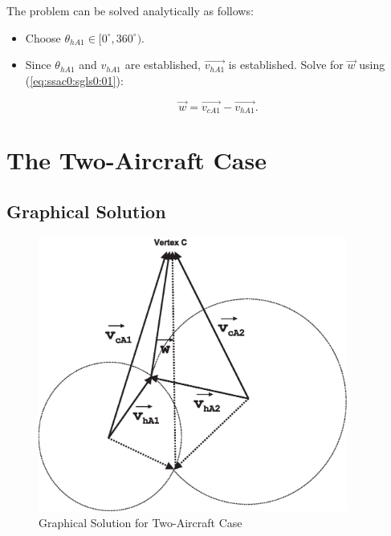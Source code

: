 \documentclass[letterpaper,10pt,titlepage]{article}
\begin{document}
The problem can be solved analytically as follows:

\begin{itemize}
\item Choose $\theta_{hA1} \in [0^\circ, 360^\circ)$.
\item Since $\theta_{hA1}$ and $v_{hA1}$ are established,
      $\vec{v_{hA1}}$ is established.
      Solve for $\vec{w}$ using (\ref{eq:ssac0:sgls0:01}):

      \begin{equation}
      \label{eq:ssac0:sasl0:01}
      \vec{w} = \vec{v_{cA1}} - \vec{v_{hA1}}   .
      \end{equation}

\end{itemize}


\section{The Two-Aircraft Case}
\label{stac0}


\subsection{Graphical Solution}
\label{stac0:sgls0}

\begin{figure}
\centering
\includegraphics[width=4.0in]{ac2gsl01.eps}
\caption{Graphical Solution for Two-Aircraft Case}
\label{fig:stac0:sgls0:00}
\end{figure}
\end{document}

